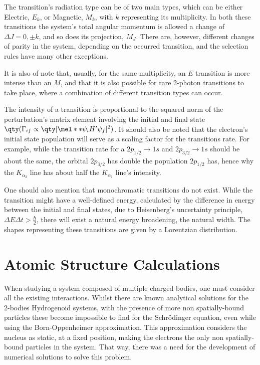 The transition's radiation type can be of two main types, which can be either Electric, $E_k$, or Magnetic, $M_k$, with $k$ representing its multiplicity.
In both these transitions the system's total angular momentum is allowed a change of $\Delta J = 0, \pm k$, and so does its projection, $M_J$. There are, however,  different changes of parity in the system, depending on the occurred transition, and the selection rules have many other exceptions.

It is also of note that, usually, for the same multiplicity, an $E$ transition is more intense than an $M$, and that it is also possible for rare 2-photon transitions to take place, where a combination of different transition types can occur.



The intensity of a transition is proportional to the squared norm of the perturbation's matrix element involving the initial and final state $\qty(\Gamma_{if}\propto \qty|\mel**{\psi_i}{H'}{\psi_f}|^2)$. It should also be noted that the electron's initial state population will serve as a scaling factor for the transitions rate.
For example, while the transition rate for a $2p_{1/2}\rightarrow1s$ and $2p_{3/2}\rightarrow1s$ should be about the same, the orbital $2p_{3/2}$ has double the population $2p_{1/2}$ has, hence why the $K_{\alpha_2}$ line has about half the $K_{\alpha_1}$ line's intensity.

One should also mention that monochromatic transitions do not exist. While the transition might have a well-defined energy, calculated by the difference in energy between the initial and final states, due to Heisenberg's uncertainty principle, $\Delta E \Delta t > \frac{\hbar}{2}$, there will exist a natural energy broadening, the natural width. The shapes representing these transitions are given by a Lorentzian distribution.








\section{Atomic Structure Calculations}

When studying a system composed of multiple charged bodies, one must consider all the existing interactions. Whilst there are known analytical solutions for the 2-bodies Hydrogenoid systems, with the presence of more non spatially-bound particles these become impossible to find for the Schrödinger equation, even while using the Born-Oppenheimer approximation.
This approximation considers the nucleus as static, at a fixed position, making the electrons the only non spatially-bound particles in the system. That way, there was a need for the development of numerical solutions to solve this problem.

